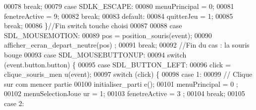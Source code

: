 \begin{DoxyCode}
00078                                                         \textcolor{keywordflow}{break};
00079                                                 \textcolor{keywordflow}{case} SDLK\_ESCAPE:
00080                                                         menuPrincipal = 0;
00081                                                         fenetreActive = 9;
00082                                                         \textcolor{keywordflow}{break};
00083                                                 \textcolor{keywordflow}{default}:
00084                                                         quitterJeu = 1;
00085                                                         \textcolor{keywordflow}{break};
00086                                                 \}\textcolor{comment}{//Fin switch touche choisi}
00087 
00088                                         \textcolor{keywordflow}{case} SDL\_MOUSEMOTION:
00089                                                 pos = position\_souris(event);
00090                                                 afficher\_ecran\_depart\_neutre(pos)
      ;
00091                                                 \textcolor{keywordflow}{break};
00092                                                 \textcolor{comment}{//Fin du cas : la souris bouge}
00093                                         \textcolor{keywordflow}{case} SDL\_MOUSEBUTTONUP:
00094                                                 \textcolor{keywordflow}{switch} (event.button.button) \{
00095                                                 \textcolor{keywordflow}{case} SDL\_BUTTON\_LEFT:
00096                                                         click = clique\_souris\_men
      u(event);
00097                                                         \textcolor{keywordflow}{switch} (click) \{
00098                                                         \textcolor{keywordflow}{case} 1:
00099                                                                 \textcolor{comment}{// Clique sur com
      mencer partie}
00100                                                                 initialiser\_parti
      e();
00101                                                                 menuPrincipal = 0
      ;
00102                                                                 menuSelectionJoue
      ur = 1;
00103                                                                 fenetreActive = 3
      ;
00104                                                                 \textcolor{keywordflow}{break};
00105                                                         \textcolor{keywordflow}{case} 2:

\end{DoxyCode}
